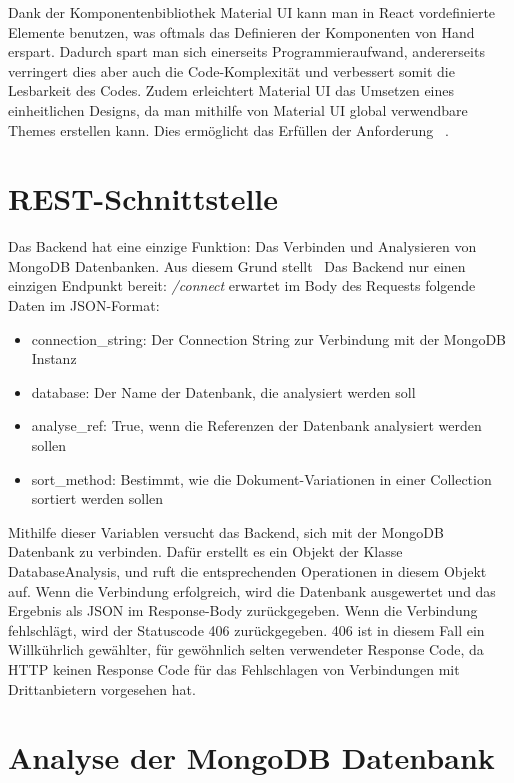 Dank der Komponentenbibliothek Material UI kann man in React vordefinierte Elemente benutzen, was oftmals das Definieren der Komponenten von Hand erspart.
Dadurch spart man sich einerseits Programmieraufwand, andererseits verringert dies aber auch die Code-Komplexität und verbessert somit die Lesbarkeit des Codes.
Zudem erleichtert Material UI das Umsetzen eines einheitlichen Designs, da man mithilfe von Material UI global verwendbare Themes erstellen kann.
Dies ermöglicht das Erfüllen der Anforderung ~.
~\autocite{mui:mui}

\section{REST-Schnittstelle}
\label{sec:rest_schnittstelle}
Das Backend hat eine einzige Funktion:
Das Verbinden und Analysieren von MongoDB Datenbanken.
Aus diesem Grund stellt ~Das Backend nur einen einzigen Endpunkt bereit: 
\textit{/connect} erwartet im Body des Requests folgende Daten im JSON-Format:
\begin{itemize}
    \item connection\_string: Der Connection String zur Verbindung mit der MongoDB Instanz
    \item database: Der Name der Datenbank, die analysiert werden soll
    \item analyse\_ref: True, wenn die Referenzen der Datenbank analysiert werden sollen
    \item sort\_method: Bestimmt, wie die Dokument-Variationen in einer Collection sortiert werden sollen
\end{itemize}
Mithilfe dieser Variablen versucht das Backend, sich mit der MongoDB Datenbank zu verbinden.
Dafür erstellt es ein Objekt der Klasse DatabaseAnalysis, und ruft die entsprechenden Operationen in diesem Objekt auf.
Wenn die Verbindung erfolgreich, wird die Datenbank ausgewertet und das Ergebnis als JSON im Response-Body zurückgegeben.
Wenn die Verbindung fehlschlägt, wird der Statuscode 406 zurückgegeben.
406 ist in diesem Fall ein Willkührlich gewählter, für gewöhnlich selten verwendeter Response Code, da HTTP keinen Response Code für das Fehlschlagen von Verbindungen mit Drittanbietern vorgesehen hat.

\section{Analyse der MongoDB Datenbank}
\label{sec:mongoDB_analyse}

